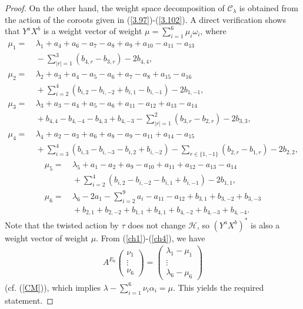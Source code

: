 \documentclass[12pt]{article}
\numberwithin{equation}{section}
\theoremstyle{definition}
\theoremstyle{remark}
\begin{document}
\begin{proof}
	On the other hand, the weight space decomposition of $\mathscr{C}_{\lambda}$ is obtained from the action of the coroots given in (\ref{3.97})-(\ref{3.102}). A direct verification shows that $Y^aX^b$ is a weight vector of weight $\mu=\sum_{i=1}^6\mu_i\omega_i$, where
	\begin{align}
		\mu_1=&\:\lambda_1+a_4+a_6-a_7-a_8+a_9+a_{10}-a_{11}-a_{13}\nonumber\\
		&\:-\sum\limits_{|r|=1}^3(b_{4,r}-b_{3,r})-2b_{4,4}, \label{ch3}\\
		\mu_2=&\:\lambda_2+a_3+a_4-a_5-a_6+a_7-a_8+a_{15}-a_{16}\nonumber\\
		&\:+\sum_{i=2}^4(b_{i,2}-b_{i,-2}+b_{i,1}-b_{i,-1})-2b_{1,-1},\\
		\mu_3=&\:\lambda_3+a_3-a_4+a_{5}-a_6+a_{11}-a_{12}+a_{13}-a_{14}\nonumber\\
		&\:+b_{4,4}-b_{4,-4}-b_{4,3}+b_{4,-3}-\sum_{|r|=1}^2(b_{3,r}-b_{2,r})-2b_{3,3}, \\
		\mu_4=&\:\lambda_4+a_2-a_{3}+a_6+a_{8}-a_9-a_{11}+a_{14}-a_{15}\nonumber\\
		&\:+\sum_{i=3}^4(b_{i,3}-b_{i,-3}-b_{i,2}+b_{i,-2})-\sum_{r\in\{1,-1\}}(b_{2,r}-b_{1,r})-2b_{2,2},
	\end{align}\begin{align}
		\mu_5=&\:\lambda_5+a_1-a_{2}+a_9-a_{10}+a_{11}+a_{12}-a_{13}-a_{14}\nonumber\\
		&\:+\sum_{i=2}^4(b_{i,2}-b_{i,-2}-b_{i,1}+b_{i,-1})-2b_{1,1},\\
		\mu_6=&\:\lambda_6-2a_1-\sum\limits_{i=2}^{9}a_i-a_{11}-a_{12}+b_{3,1}+b_{3,-2}+b_{3,-3}\nonumber\\
		&\:+b_{2,1}+b_{2,-2}+b_{1,1}+b_{4,1}+b_{4,-2}+b_{4,-3}+b_{4,-4}. \label{ch4}
	\end{align}
	Note that the twisted action by $\tau$ does not change $\mathscr{H}$, so $(Y^aX^b)^*$ is also a weight vector of weight $\mu$. From (\ref{ch1})-(\ref{ch4}), we have
	\begin{align}
		A^{E_6}\begin{pmatrix}
			\nu_1\\\vdots\\\nu_6
		\end{pmatrix}=\begin{pmatrix}
			\lambda_1-\mu_1\\\vdots\\\lambda_6-\mu_6
		\end{pmatrix}
	\end{align}
	(cf. (\ref{CM})), which implies $\lambda-\sum_{i=1}^6\nu_i\alpha_i=\mu$. This yields the required statement.
\end{proof}
\end{document}
